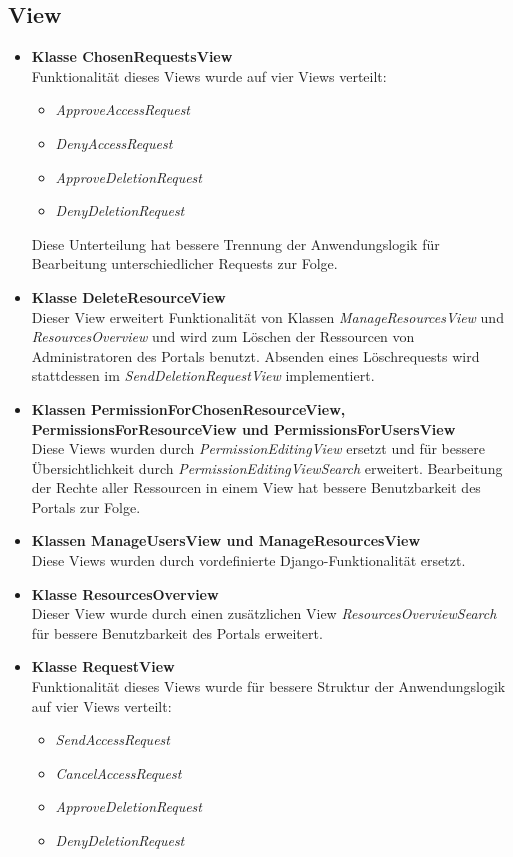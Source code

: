 \documentclass[parskip=full,11pt]{scrartcl}
\begin{document}
\newpage
\subsection{View} 
 
\begin{itemize}
\item \textbf{Klasse ChosenRequestsView}\\
Funktionalität dieses Views wurde auf vier Views verteilt:
\begin{itemize}
\item \textit{ApproveAccessRequest}
\item \textit{DenyAccessRequest}
\item \textit{ApproveDeletionRequest}
\item \textit{DenyDeletionRequest}
\end{itemize}
Diese Unterteilung hat bessere Trennung der Anwendungslogik für Bearbeitung unterschiedlicher Requests zur Folge. 

\item \textbf{Klasse DeleteResourceView}\\
Dieser View erweitert Funktionalität von Klassen \textit{ManageResourcesView} und \textit{ResourcesOverview} und wird zum Löschen der Ressourcen von Administratoren des Portals benutzt. Absenden eines Löschrequests wird stattdessen im \textit{SendDeletionRequestView} implementiert. 

\item \textbf{Klassen PermissionForChosenResourceView,  PermissionsForResourceView und PermissionsForUsersView}\\
Diese Views wurden durch \textit{PermissionEditingView} ersetzt und für bessere Übersichtlichkeit durch  \textit{PermissionEditingViewSearch} erweitert. Bearbeitung der Rechte aller Ressourcen in einem View hat bessere Benutzbarkeit des Portals zur Folge.

\item \textbf{Klassen ManageUsersView und ManageResourcesView}\\
Diese Views wurden durch vordefinierte Django-Funktionalität ersetzt.

\item \textbf{Klasse ResourcesOverview}\\
Dieser View wurde durch einen zusätzlichen View \textit{ResourcesOverviewSearch} für bessere Benutzbarkeit des Portals erweitert.

\item \textbf{Klasse RequestView}\\
Funktionalität dieses Views wurde für bessere Struktur der Anwendungslogik auf vier Views verteilt:
\begin{itemize}
\item \textit{SendAccessRequest}
\item \textit{CancelAccessRequest}
\item \textit{ApproveDeletionRequest}
\item \textit{DenyDeletionRequest}
\end{itemize}


\end{itemize}
\end{document}
